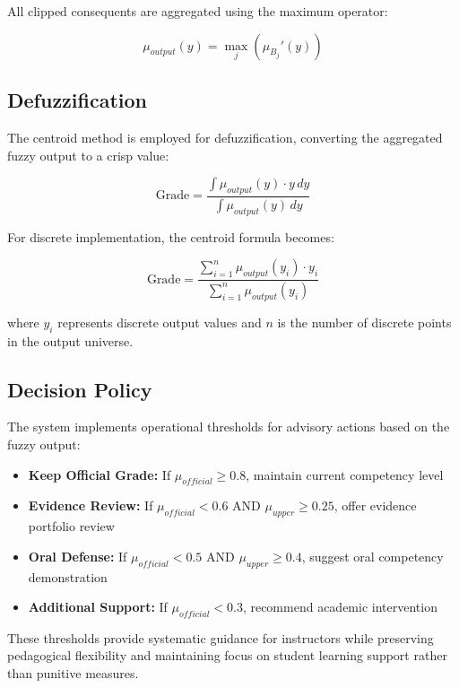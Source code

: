 All clipped consequents are aggregated using the maximum operator:

\begin{equation}
\mu_{output}(y) = \max_j(\mu_{B_j}'(y))
\end{equation}

\subsection{Defuzzification}

The centroid method is employed for defuzzification, converting the aggregated fuzzy output to a crisp value:

\begin{equation}
\text{Grade} = \frac{\int \mu_{output}(y) \cdot y \, dy}{\int \mu_{output}(y) \, dy}
\end{equation}

For discrete implementation, the centroid formula becomes:

\begin{equation}
\text{Grade} = \frac{\sum_{i=1}^{n} \mu_{output}(y_i) \cdot y_i}{\sum_{i=1}^{n} \mu_{output}(y_i)}
\end{equation}

where $y_i$ represents discrete output values and $n$ is the number of discrete points in the output universe.

\subsection{Decision Policy}

The system implements operational thresholds for advisory actions based on the fuzzy output:

\begin{itemize}
\item \textbf{Keep Official Grade:} If $\mu_{official} \geq 0.8$, maintain current competency level
\item \textbf{Evidence Review:} If $\mu_{official} < 0.6$ AND $\mu_{upper} \geq 0.25$, offer evidence portfolio review
\item \textbf{Oral Defense:} If $\mu_{official} < 0.5$ AND $\mu_{upper} \geq 0.4$, suggest oral competency demonstration
\item \textbf{Additional Support:} If $\mu_{official} < 0.3$, recommend academic intervention
\end{itemize}

These thresholds provide systematic guidance for instructors while preserving pedagogical flexibility and maintaining focus on student learning support rather than punitive measures.
